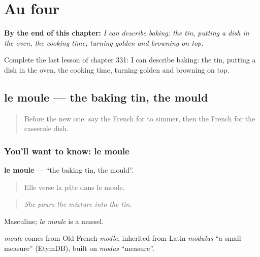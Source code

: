 
\chapter{Au four}
\label{ch:fr-au-four}

\begin{chapteropening}
\textbf{By the end of this chapter:} \emph{I can describe baking: the tin, putting a dish in the oven, the cooking time, turning golden and browning on top.}

Complete the last lesson of chapter 331: I can describe baking: the tin, putting a dish in the oven, the cooking time, turning golden and browning on top.
\end{chapteropening}

\section[le moule]{le moule — the baking tin, the mould}

\label{lesson:FR-C331-moule}



\begin{quote}
Before the new one: say the French for to simmer, then the French for the casserole dish.
\end{quote}

\subsection*{You'll want to know: le moule}
\textbf{le moule} — \textquotedblleft{}the baking tin, the mould\textquotedblright{}.

\begin{quote}
Elle verse la pâte dans le moule.
\end{quote}

\begin{quote}
\emph{She pours the mixture into the tin.}
\end{quote}

Masculine; \emph{la moule} is a mussel.

\begin{cousinweb}
\emph{moule} comes from Old French \emph{modle}, inherited from Latin \emph{modulus} \textquotedblleft{}a small measure\textquotedblright{} (EtymDB), built on \emph{modus} \textquotedblleft{}measure\textquotedblright{}.
\end{cousinweb}

